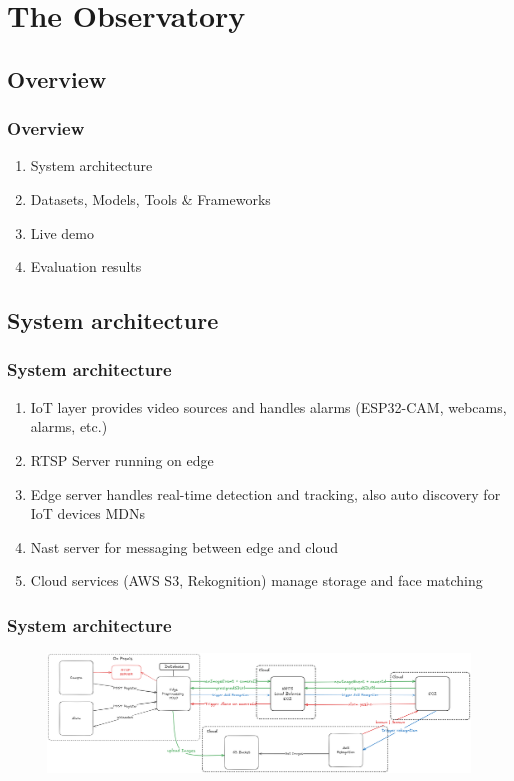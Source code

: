 \documentclass[11pt,t,usepdftitle=false,aspectratio=169]{beamer}
\begin{document}
\section{The Observatory}

\subsection{Overview}

\begin{frame}
	\frametitle{Overview}


	\bigskip
	\begin{enumerate}
		\item {System architecture}
		\item {Datasets, Models, Tools \& Frameworks}
		\item {Live demo}
		\item {Evaluation results}
	\end{enumerate}

\end{frame}

\subsection{System architecture}

\begin{frame}
	\frametitle{System architecture}
	\begin{enumerate}
		\item IoT layer provides video sources and handles alarms (ESP32-CAM, webcams, alarms, etc.)
		\item RTSP Server running on edge
		\item Edge server handles real-time detection and tracking, also auto discovery for IoT devices MDNs
		\item Nast server for messaging between edge and cloud
		\item Cloud services (AWS S3, Rekognition) manage storage and face matching
	\end{enumerate}
\end{frame}

\begin{frame}
	\frametitle{System architecture}
	\vspace{1cm}
	\begin{figure}
		\centering
		\includegraphics{_images/Distributed_Systems_Architecture_V2.png}
	\end{figure}
\end{frame}
\end{document}
